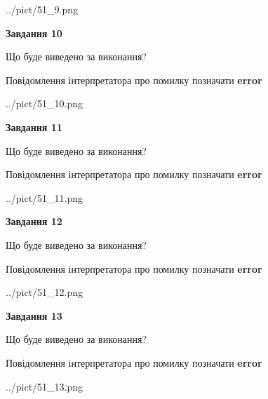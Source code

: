 \documentclass[11pt, ukrainian]{article}
\begin{document}
{\begin {large}
\begin{center}
	{../pict/51_9.png}
\end{center}
\newpage

{\begin {center}\textbf{Завдання 10}\end {center}}\par
Що буде виведено за виконання? \par
Повідомлення інтерпретатора про помилку позначати \textbf{error}

\begin{center}
	{../pict/51_10.png}
\end{center}
\newpage

{\begin {center}\textbf{Завдання 11}\end {center}}\par
Що буде виведено за виконання? \par
Повідомлення інтерпретатора про помилку позначати \textbf{error}

\begin{center}
	{../pict/51_11.png}
\end{center}
\newpage

{\begin {center}\textbf{Завдання 12}\end {center}}\par
Що буде виведено за виконання? \par
Повідомлення інтерпретатора про помилку позначати \textbf{error}

\begin{center}
	{../pict/51_12.png}
\end{center}
\newpage

{\begin {center}\textbf{Завдання 13}\end {center}}\par
Що буде виведено за виконання? \par
Повідомлення інтерпретатора про помилку позначати \textbf{error}

\begin{center}
	{../pict/51_13.png}
\end{center}
\newpage


\end{large}}
\end{document}
